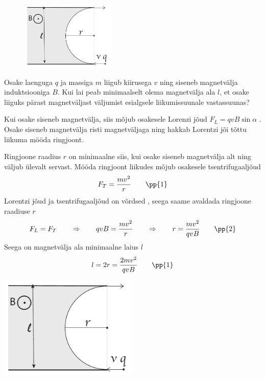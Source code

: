 \setAuthor{}

\begin{figure}
	\vspace{-15pt}
	\begin{center}
		\includegraphics[width = 0.4\textwidth]{2019-v2g-05-yl.pdf}
	\end{center}
\end{figure}


Osake laenguga $q$ ja massiga $m$ liigub kiirusega $v$ ning siseneb  magnetvälja induktsiooniga $B$. Kui lai peab minimaalselt olema magnetvälja ala $l$, et osake liiguks pärast magnetväljast väljumist esialgsele liikumissuunale vastassuunas?





\hint

\solu
Kui osake siseneb magnetvälja, siis mõjub osakesele Lorenzi jõud $F_L = qvB\sin{\alpha}$ . Osake siseneb magnetvälja risti magnetväljaga ning hakkab Lorentzi jõi tõttu liikuma mööda ringjoont. 

Ringjoone raadius $r$ on minimaalne siis, kui osake siseneb magnetvälja alt ning väljub ülevalt servast. Mööda ringjoont liikudes mõjub osakesele tsentrifugaaljõud
\[ F_T = \frac{mv^2}{r} \quad\quad\pp{1} \]
Lorentzi jõud ja tsentrifugaaljõud on võrdsed , seega saame avaldada ringjoone raadiuse $r$
\[ F_L = F_T \quad\quad\Rightarrow\quad\quad qvB = \frac{mv^2}{r} \quad\quad\Rightarrow\quad\quad r = \frac{mv^2}{qvB} \quad\quad\pp{2}\]
Seega on magnetvälja ala minimaalne laius $l$
\[ l = 2r = \frac{2mv^2}{qvB} \quad\quad\pp{1} \]

 \vspace{-20pt}
  \begin{center}
    \includegraphics[width=0.5\textwidth]{2019-v2g-05-yl.pdf}
  \end{center}
  \vspace{-20pt}
\probend
